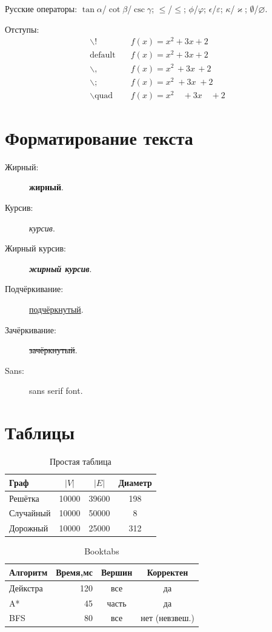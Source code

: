 \documentclass[font=modern]{cmcmsuthesis-master}
\begin{document}
Русские операторы: $\tan\alpha$/$\cot\beta$/$\csc\gamma$; $\le$/$\leqslant$; $\phi$/$\varphi$; $\epsilon$/$\varepsilon$; $\kappa$/$\varkappa$; $\emptyset$/$\varnothing$.

Отступы:
\[\begin{aligned}\backslash!&\quad f(x)=x^2\!+3x\!+2\\\text{default}&\quad f(x)=x^2+3x+2\\\backslash,&\quad f(x)=x^2\,+3x\,+2\\\backslash;&\quad f(x)=x^2\;+3x\;+2\\\backslash\text{quad}&\quad f(x)=x^2\quad+3x\quad+2\end{aligned}\]

\section{Форматирование текста}
\begin{description}
\item[Жирный:] \textbf{жирный}.\item[Курсив:] \emph{курсив}.
\item[Жирный курсив:] \textbf{\emph{жирный курсив}}.
\item[Подчёркивание:] \underline{подчёркнутый}.
\item[Зачёркивание:] \sout{зачёркнутый}.
\item[Sans:] \textsf{sans serif font}.
\end{description}

\section{Таблицы}
\begin{table}[htbp]\caption{Простая таблица}\label{tab:simple}\centering
\begin{tabular}{|l|c|c|c|}\hline Граф&$|V|$&$|E|$&Диаметр\\\hline
Решётка&10000&39600&198\\\hline
Случайный&10000&50000&8\\\hline
Дорожный&10000&25000&312\\\hline
\end{tabular}\end{table}

\begin{table}[htbp]\caption{Booktabs}\label{tab:booktabs}\centering
\begin{tabular}{lrcc}\toprule
\textbf{Алгоритм}&\textbf{Время,мс}&\textbf{Вершин}&\textbf{Корректен}\\\midrule
Дейкстра&120&все&да\\
A*&45&часть&да\\
BFS&80&все&нет (невзвеш.)\\\bottomrule
\end{tabular}\end{table}
\end{document}
